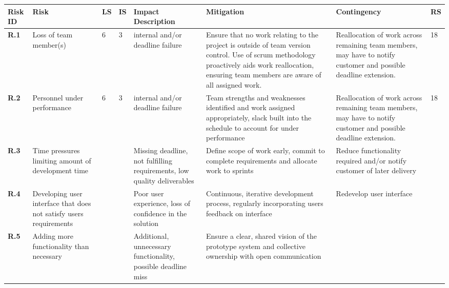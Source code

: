 \begin{longtable}[H]{| p{0.7cm} | p{2cm} | p{0.3cm} | p{0.3cm} | p{2.4cm} | p{4.1cm} | p{3cm} | p{0.4cm} |}
  \hline
  \cellcolor{titleColor}\textbf{Risk ID} &
  \cellcolor{titleColor}\textbf{Risk} &
  \cellcolor{titleColor}\textbf{LS} &
  \cellcolor{titleColor}\textbf{IS} &
  \cellcolor{titleColor}\textbf{Impact Description} &
  \cellcolor{titleColor}\textbf{Mitigation} &
  \cellcolor{titleColor}\textbf{Contingency} &
  \cellcolor{titleColor}\textbf{RS}\\
  
  \hline \textbf{R.1}
  & Loss of team member(s)
  & 6
  & 3
  & internal and/or deadline failure
  & Ensure that no work relating to the project is outside of team
  version control. Use of scrum methodology proactively aids work
  reallocation, ensuring team members are aware of all assigned work.
  & Reallocation of work across remaining team members, may have to notify customer and possible deadline extension.
  & 18 \\
  
  \hline \textbf{R.2}
  & Personnel under performance
  & 6
  & 3
  & internal and/or deadline failure
  & Team strengths and weaknesses identified and work assigned appropriately, slack built into the schedule to account for under performance
  & Reallocation of work across remaining team members, may have to notify customer and possible deadline extension.
  & 18 \\
  
  \hline \textbf{R.3}
  & Time pressures limiting amount of development time
  & 
  & 
  & Missing deadline, not fulfilling requirements, low quality deliverables
  & Define scope of work early, commit to complete requirements and allocate work to sprints 
  & Reduce functionality required and/or notify customer of later delivery
  & \\
  
  \hline \textbf{R.4}
  & Developing user interface that does not satisfy users requirements
  & 
  & 
  & Poor user experience, loss of confidence in the solution
  & Continuous, iterative development process, regularly incorporating users feedback on interface
  & Redevelop user interface
  & \\
  
  \hline \textbf{R.5}
  & Adding more functionality than necessary
  & 
  & 
  & Additional, unnecessary functionality, possible deadline miss
  & Ensure a clear, shared vision of the prototype system and collective ownership with open communication
  & 
  & \\
  

\end{longtable}

